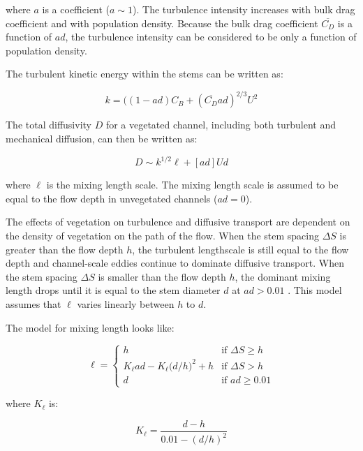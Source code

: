 \documentclass[10pt]{article}
\begin{document}
\noindent where $a$ is a coefficient ($a\sim1$). The turbulence intensity increases with bulk drag coefficient and with population density. Because the bulk drag coefficient $\overline{C_D}$ is a function of $ad$, the turbulence intensity can be considered to be only a function of population density.

The turbulent kinetic energy within the stems can be written as:

\begin{equation}
k = ((1 - ad) C_B + (\overline{C_D} ad)^{2/3} U^2
\end{equation}

The total diffusivity $D$ for a vegetated channel, including both turbulent and mechanical diffusion, can then be written as:

\begin{equation}
D \sim k^{1/2} \ell + [ad]Ud
\end{equation}

\noindent where $\ell$ is the mixing length scale. The mixing length scale is assumed to be equal to the flow depth in unvegetated channels ($ad = 0$).

The effects of vegetation on turbulence and diffusive transport are dependent on the density of vegetation on the path of the flow. When the stem spacing $\Delta S$ is greater than the flow depth $h$, the turbulent lengthscale is still equal to the flow depth and channel-scale eddies continue to dominate diffusive transport. When the stem spacing $\Delta S$ is smaller than the flow depth $h$, the dominant mixing length drops until it is equal to the stem diameter $d$ at $ad > 0.01$ \citep{nepf1997model}. This model assumes that $\ell$ varies linearly between $h$ to $d$.

The model for mixing length looks like:

\[
 \ell = 
  \begin{cases} 
   h & \text{if } \Delta S \geq h \\
   K_\ell ad - K_\ell \big(d/h\big)^2 + h    & \text{if } \Delta S > h \\
   d & \text{if } ad \geq 0.01
  \end{cases}
\]

\noindent where $K_\ell$ is:

\begin{equation}
K_\ell = \frac{d-h}{0.01 - (d/h)^2}
\end{equation}




\end{document}
